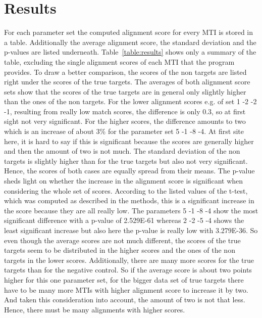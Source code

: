 \documentclass[12pt]{article}
\begin{document}
\section{Results}
For each parameter set the computed alignment score for every MTI is stored in a table. Additionally the average alignment score, the standard deviation and the p-values are listed underneath. Table~\ref{table:results} shows only a summary of the table, excluding the single alignment scores of each MTI that the program provides. To draw a better comparison, the scores of the non targets are listed right under the scores of the true targets. The averages of both alignment score sets show that the scores of the true targets are in general only slightly higher than the ones of the non targets. For the lower alignment scores e.g. of set 1 -2 -2 -1, resulting from really low match scores, the difference is only 0.3, so at first sight not very significant. For the higher scores, the difference amounts to two which is an increase of about 3\% for the parameter set 5 -1 -8 -4. At first site here, it is hard to say if this is significant because the scores are generally higher and then the amount of two is not much. 
The standard deviation of the non targets is slightly higher than for the true targets but also not very significant. Hence, the scores of both cases are equally spread from their means. 
The p-value sheds light on whether the increase in the alignment score is significant when considering the whole set of scores. According to the listed values of the t-test, which was computed as described in the methods, this is a significant increase in the score because they are all really low. The parameters 5 -1 -8 -4 show the most significant difference with a p-value of 2.529E-61 whereas 2 -2 -5 -4 shows the least significant increase but also here the p-value is really low with 3.279E-36. So even though the average scores are not much different, the scores of the true targets seem to be distributed in the higher scores and the ones of the non targets in the lower scores. Additionally, there are many more scores for the true targets than for the negative control. So if the average score is about two points higher for this one parameter set, for the bigger data set of true targets there have to be many more MTIs with higher alignment score to increase it by two. And taken this consideration into account, the amount of two is not that less. Hence, there must be many alignments with higher scores. 
\end{document}

